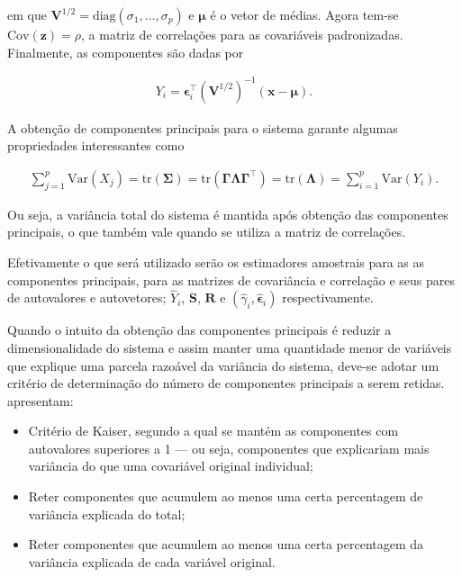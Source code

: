 \documentclass[12pt, a4paper, twoside]{report}
\numberwithin{equation}{subsection} %
\begin{document}
\noindent em que $\boldsymbol{V}^{1/2} = \text{diag}(\sigma_1, \dots, \sigma_p)$ e $\boldsymbol{\mu}$ é o vetor de médias. Agora tem-se $\text{Cov}(\boldsymbol{z}) = \rho$, a matriz de correlações para as covariáveis padronizadas. Finalmente, as componentes são dadas por

\begin{align}
	Y_i = \boldsymbol{\epsilon}_i^\top \left( \boldsymbol{V}^{1/2}\right)^{-1} (\boldsymbol{x} - \boldsymbol{\mu}).
\end{align}

A obtenção de componentes principais para o sistema garante algumas propriedades interessantes como

\begin{align}
	\sum\limits_{j = 1}^{p} \text{Var}\left( X_j \right) = \text{tr} \left( \boldsymbol{\Sigma} \right)  = \text{tr} \left( \boldsymbol{\Gamma \Lambda \Gamma^\top} \right) = \text{tr} \left( \boldsymbol{\Lambda} \right) =  \sum\limits_{i = 1}^{p} \text{Var}\left( Y_i \right).
\end{align}

\noindent Ou seja, a variância total do sistema é mantida após obtenção das componentes principais, o que também vale quando se utiliza a matriz de correlações.   

Efetivamente o que será utilizado serão os estimadores amostrais para as as componentes principais, para as matrizes de covariância e correlação e seus pares de autovalores e autovetores; $\hat{Y}_i$, $\boldsymbol{S}$, $\boldsymbol{R}$ e $(\hat{\gamma}_i, \hat{\boldsymbol{\epsilon}}_i)$ respectivamente.

Quando o intuito da obtenção das componentes principais é reduzir a dimensionalidade do sistema e assim manter uma quantidade menor de variáveis que explique uma parcela razoável da variância do sistema, deve-se adotar um critério de determinação do número de componentes principais a serem retidas. \cite{metodosmultivariados_artes} apresentam:

\begin{itemize}
	\item Critério de Kaiser, segundo a qual se mantém as componentes com autovalores superiores a 1 --- ou seja, componentes que explicariam mais variância do que uma covariável original individual; \\
	\item Reter componentes que acumulem ao menos uma certa percentagem de variância explicada do total; \\
	\item Reter componentes que acumulem ao menos uma certa percentagem da variância explicada de cada variável original.
\end{itemize}
\end{document}
